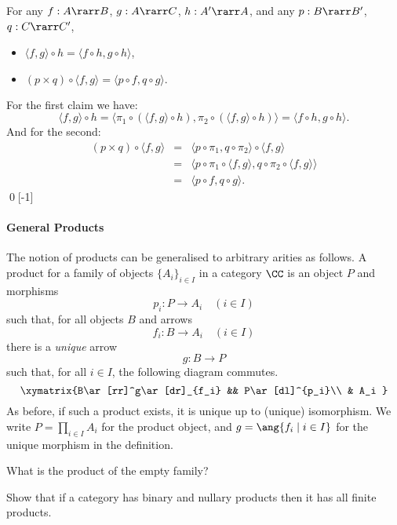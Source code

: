 \documentclass[12pt]{article}
\begin{document}
\begin{myproposition}\label{p:times} For any $f:A\rarr B$, $g:A\rarr C$, $h:A'\rarr A$, and any $p:B\rarr B'$, $q:C\rarr C'$,
\begin{itemize}
    \item $\langle f, g \rangle \circ h = \langle f \circ h, g \circ h \rangle$,
    \item $(p \times q) \circ \langle f, g \rangle = \langle p \circ f, q \circ g \rangle.$
\end{itemize}
\end{myproposition}
\proof For the first claim we have:
\[ \langle f, g \rangle \circ h = \langle \pi_{1} \circ (\langle f, g \rangle \circ h), \pi_{2} \circ (\langle f, g \rangle \circ h) \rangle =
    \langle f \circ h, g \circ h \rangle . \]
And for the second:
\[ \begin{array}{rcl}
(p \times q) \circ \langle f, g \rangle & = & \langle p \circ \pi_{1},  q \circ \pi_{2} \rangle \circ \langle f, g \rangle \\
& = &   \langle p \circ \pi_{1} \circ \langle f, g \rangle,  q \circ \pi_{2}  \circ \langle f, g \rangle \rangle \\
& = &   \langle p \circ f,  q \circ g \rangle .
\end{array}
\]
\qed[-1]




\paragraph{General Products} The notion of products can be generalised to arbitrary arities as follows.
A product for a family of objects $\{A_i \}_{i \in I}$ in a category $\CC$ is an object $P$ and morphisms
\[ p_i : P \longrightarrow A_i \quad (i \in I) \]
such that, for all objects $B$ and arrows
\[ f_i : B \longrightarrow A_i \quad (i \in I) \]
there is a \emph{unique} arrow
\[ g : B \longrightarrow P \]
such that, for all $i \in I$, the following diagram commutes.
\[ \xymatrix{B\ar[rr]^g\ar[dr]_{f_i} && P\ar[dl]^{p_i}\\ & A_i }\]
%
As before, if such a product exists, it is unique up to (unique) isomorphism. We write $P=\prod_{i\in I}A_i$ for the product object, and
$g=\ang{f_i\mid i\in I}$ for the unique morphism in the definition.

\begin{myexercise}
    What is the product of the empty family?
\end{myexercise}
\begin{myexercise}
Show that if a category has binary and nullary products then it has all finite products.
\end{myexercise}
\end{document}
